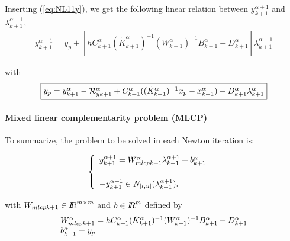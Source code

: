 Inserting (\ref{eq:NL11y}), we get the following linear relation between $y^{\alpha+1}_{k+1}$ and $\lambda^{\alpha+1}_{k+1}$, 
\begin{equation}
   \begin{array}{l}
 y^{\alpha+1}_{k+1} = y_p + \left[ h  C^{\alpha}_{k+1} (\tilde K^{\alpha}_{k+1})^{-1}( W^{\alpha}_{k+1})^{-1}  B^{\alpha}_{k+1} + D^{\alpha}_{k+1} \right]\lambda^{\alpha+1}_{k+1}
   \end{array}
\end{equation}

with 
\begin{equation}\fbox{$
y_p = y^{\alpha}_{k+1} -\mathcal R^{\alpha}_{yk+1} + C^{\alpha}_{k+1}((\tilde K^{\alpha}_{k+1})^{-1}x_p -x^{\alpha}_{k+1}) -
D^{\alpha}_{k+1} \lambda^{\alpha}_{k+1} $}
\end{equation}

\paragraph{Mixed linear complementarity problem (MLCP)}To summarize, the problem to be solved in each Newton iteration is:\\{
  \begin{minipage}[l]{1.0\linewidth}
    \begin{equation}
      \begin{cases}
      \begin{array}[l]{l}
        y^{\alpha+1}_{k+1} =   W_{mlcpk+1}^{\alpha}  \lambda^{\alpha+1}_{k+1} + b^{\alpha}_{k+1}
        \\ \\
        -y^{\alpha+1}_{k+1} \in N_{[l,u]}(\lambda^{\alpha+1}_{k+1} ). 
      \end{array}
      \label{eq:NL14}
      \end{cases}
    \end{equation}
  \end{minipage}
}
with $W_{mlcpk+1}\in \mbox{\rm $I\!\!R$}^{m\times m}$ and $b\in\mbox{\rm $I\!\!R$}^{m}$ defined by
\begin{equation}
  \label{eq:NL15}
 \begin{array}[l]{l}
   W_{mlcpk+1}^{\alpha} = h  C^{\alpha}_{k+1} (\tilde K^{\alpha}_{k+1})^{-1} (W^{\alpha}_{k+1})^{-1}  B^{\alpha}_{k+1} + D^{\alpha}_{k+1} \\
   b^{\alpha}_{k+1} = y_p
\end{array}
\end{equation}

